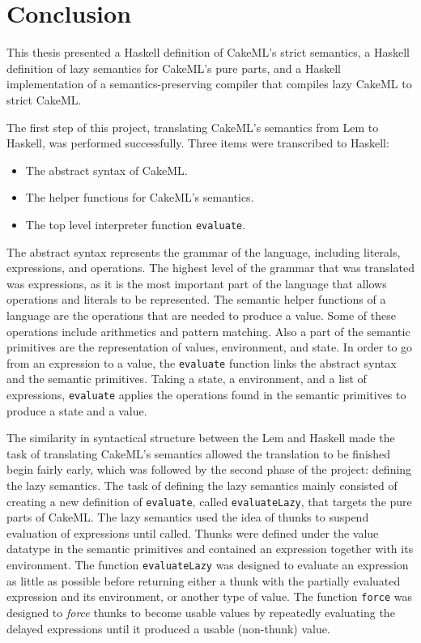 \chapter{Conclusion}
This thesis presented a Haskell definition of CakeML's strict semantics,
a Haskell definition of lazy semantics for CakeML's pure parts, and a Haskell
implementation of a semantics-preserving compiler that compiles lazy CakeML to
strict CakeML.

The first step of this project, translating CakeML's semantics from Lem to
Haskell, was performed successfully. Three items were transcribed to Haskell:

\begin{itemize}
\item The abstract syntax of CakeML.
\item The helper functions for CakeML's semantics.
\item The top level interpreter function \texttt{evaluate}.
\end{itemize}
The abstract syntax represents the grammar of the language, including literals,
expressions, and operations. The highest level of the grammar that was
translated was expressions, as it is the most important part of the language
that allows operations and literals to be represented.
The semantic helper functions of a language are the operations that are needed
to produce a value. Some of these operations include arithmetics and
pattern matching. Also a part of the semantic primitives are the representation
of values, environment, and state.
In order to go from an expression to a value, the \texttt{evaluate} function
links the abstract syntax and the semantic primitives. Taking a state,
a environment, and a list of expressions, \texttt{evaluate} applies the
operations found in the semantic primitives to produce a state and a value.

The similarity in syntactical structure between the Lem and Haskell made the
task of translating CakeML's semantics allowed the translation to be finished
begin fairly early, which was followed by the second phase of the project:
defining the lazy semantics. The task of defining the lazy semantics mainly
consisted of creating a new definition of \texttt{evaluate}, called
\texttt{evaluateLazy}, that targets the pure parts of CakeML.
The lazy semantics used the idea of thunks to suspend
evaluation of expressions until called. Thunks were defined under the value
datatype in the semantic primitives and contained an expression together with
its environment. The function \texttt{evaluateLazy} was designed to evaluate an
expression as little as possible before returning either a thunk with the
partially evaluated expression and its environment, or another type of value.
The function \texttt{force} was designed to \textit{force} thunks to become
usable values by repeatedly evaluating the delayed expressions until it produced
a usable (non-thunk) value.

